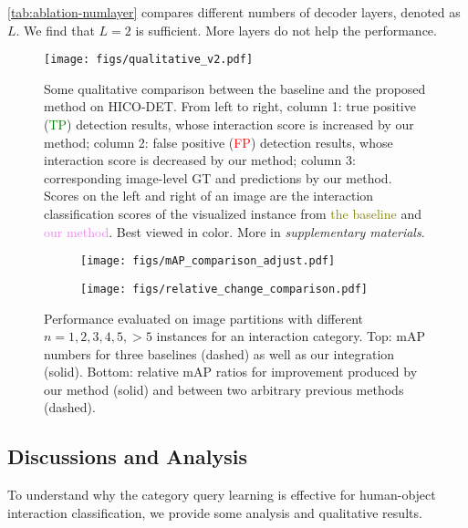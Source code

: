 \documentclass[10pt,twocolumn,letterpaper]{article}
\def\supp{\textit{\textcolor{BrickRed}{supplementary materials}}}
\begin{document}
\cref{tab:ablation-numlayer} compares different numbers of decoder layers, denoted as $L$. We find that $L=2$ is sufficient. More layers do not help the performance.

\begin{figure}
  \centering
\texttt{[image: figs/qualitative\_v2.pdf]}
  \caption{Some qualitative comparison between the baseline and the proposed method on HICO-DET.
  From left to right, column 1: true positive (\textcolor{Green}{TP}) detection results, whose interaction score is increased by our method; column 2: false positive (\textcolor{red}{FP}) detection results, whose interaction score is decreased by our method; column 3: corresponding image-level GT and predictions by our method. Scores on the left and right of an image are the interaction classification scores of the visualized instance from \textcolor{olive}{the baseline} and \textcolor{Violet}{our method}. Best viewed in color. More in \supp.
  }
  \vspace{-8pt}
  \label{fig:qualitative}
\end{figure}

\begin{figure}
  \centering
  \begin{subfigure}{0.9\linewidth}
\texttt{[image: figs/mAP\_comparison\_adjust.pdf]}
    \vspace{-4mm}
\label{fig:analysis-a}
  \end{subfigure}
  \begin{subfigure}{0.9\linewidth}
\texttt{[image: figs/relative\_change\_comparison.pdf]}
\label{fig:analysis-c}
  \end{subfigure}
  \vspace{-8mm}
  \caption{Performance evaluated on image partitions with different $n=1,2,3,4,5,>5$ instances for an interaction category. Top: mAP numbers for three baselines (dashed) as well as our integration (solid). Bottom: relative mAP ratios for improvement produced by our method (solid) and between two arbitrary previous methods (dashed).
  }
  \vspace{-8pt}
  \label{fig:densityanalysis}
\end{figure}

\subsection{Discussions and Analysis}
\label{subsec:analysis}
To understand why the category query learning is effective for human-object interaction classification, we provide some analysis and qualitative results. 
\end{document}
